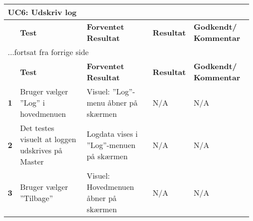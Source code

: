 
\begin{center}
\begin{longtable}{|p{}|p{}|p{}|p{}|p{}|} %
\hline
\multicolumn{5}{|l|}{\textbf{UC6: Udskriv log}} \\ \hline
\multicolumn{1}{|c|}{} &
\textbf{Test} &
\textbf{Forventet \newline Resultat} &
\textbf{Resultat} &
\textbf{Godkendt/ \newline Kommentar} \\ \hline 
\endfirsthead

\multicolumn{5}{l}{...fortsat fra forrige side} \\ \hline 
\multicolumn{1}{|c|}{} &
\textbf{Test} &
\textbf{Forventet \newline Resultat} &
\textbf{Resultat} &
\textbf{Godkendt/ \newline Kommentar} \\ \hline 
\endhead

\textbf{1}	&Bruger vælger ''Log'' i hovedmenuen
			&Visuel: ''Log''-menu åbner på skærmen
			&N/A
			&N/A \\ \hline 
			
\textbf{2}	&Det testes visuelt at loggen udskrives på Master
			&Logdata vises i ''Log''-menuen på skærmen
			&N/A
			&N/A \\ \hline 
			
\textbf{3}	&Bruger vælger ''Tilbage''
			&Visuel: Hovedmenuen åbner på skærmen
			&N/A
			&N/A \\ \hline 
			
\end{longtable}
	\label{ATUC8} 
\end{center}
